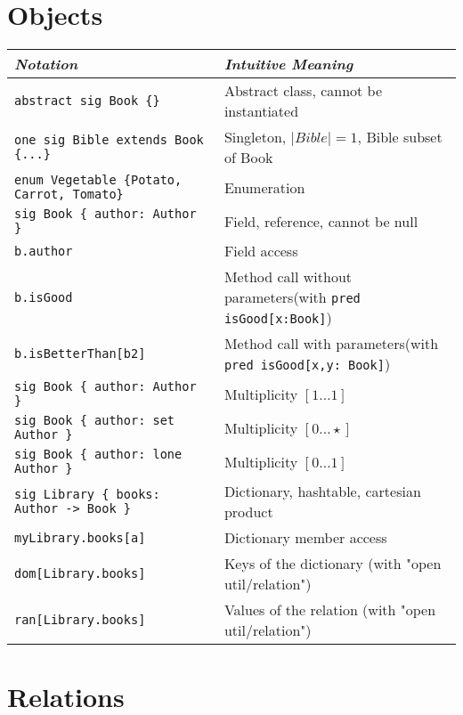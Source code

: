 \documentclass{article}
\newlength\tw
\begin{document}
\section{Objects}

\begin{longtable}{|p{\tw}|p{\tw}|}
\hline
\emph{Notation} & \emph{Intuitive Meaning} \\
\hline
\texttt{abstract sig Book \{\}} & Abstract class, cannot be instantiated \\
\hline
\texttt{one sig Bible extends Book \{...\}} & Singleton, $|Bible| = 1$, Bible subset of Book \\
\hline
\texttt{enum Vegetable \{Potato, Carrot, Tomato\}} & Enumeration \\
\hline
\texttt{sig Book \{ author: Author \}} & Field, reference, cannot be null \\
\hline
\texttt{b.author} & Field access\\
\hline
\texttt{b.isGood} & Method call without parameters\newline (with \texttt{pred  isGood[x:Book]}) \\
\hline
\texttt{b.isBetterThan[b2]} & Method call with parameters\newline (with \texttt{pred  isGood[x,y: Book]}) \\
\hline
\texttt{sig Book \{ author: Author \}} & Multiplicity $[1\ldots1]$ \\
\hline
\texttt{sig Book \{ author: set Author \}} & Multiplicity $[0\ldots\star]$ \\
\hline
\texttt{sig Book \{ author: lone Author \}} & Multiplicity $[0\ldots1]$ \\
\hline
\texttt{sig Library \{ books: Author -> Book \}} & Dictionary, hashtable, cartesian product\\
\hline
\texttt{myLibrary.books[a]} & Dictionary member access\\
\hline
\texttt{dom[Library.books]} & Keys of the dictionary (with "open util/relation")\\
\hline
\texttt{ran[Library.books]} & Values of the relation (with "open util/relation") \\
\hline
\end{longtable}

\section{Relations}
\end{document}
